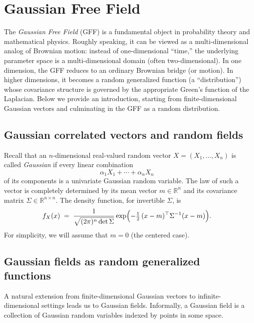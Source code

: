 \documentclass[letterpaper,11pt,oneside,reqno]{book}
\numberwithin{equation}{chapter}  %
\theoremstyle{definition}
\begin{document}
\section{Gaussian Free Field}
\label{lecture9:sec:GFF}

The \emph{Gaussian Free Field} (GFF) is a fundamental object in probability theory and mathematical physics. Roughly speaking, it can be viewed as a multi-dimensional analog of Brownian motion: instead of one-dimensional “time,” the underlying parameter space is a multi-dimensional domain (often two-dimensional). In one dimension, the GFF reduces to an ordinary Brownian bridge (or motion). In higher dimensions, it becomes a random generalized function (a “distribution”) whose covariance structure is governed by the appropriate Green's function of the Laplacian. Below we provide an introduction, starting from finite-dimensional Gaussian vectors and culminating in the GFF as a random distribution.

\subsection{Gaussian correlated vectors and random fields}
\label{lecture9:subsec:gauss_vectors_random_fields}

Recall that an $n$-dimensional real-valued random vector $X = (X_1,\dots, X_n)$ is called \emph{Gaussian} if every linear combination
\[
\alpha_1 X_1 + \cdots + \alpha_n X_n
\]
of its components is a univariate Gaussian random variable. The law of such a vector is completely determined by its mean vector $m \in \mathbb{R}^n$ and its covariance matrix $\Sigma \in \mathbb{R}^{n\times n}$. The density function, for invertible $\Sigma$, is
\[
f_{X}(x) \;=\; \frac{1}{\sqrt{(2\pi)^n \det \Sigma}}
\exp\Bigl(-\tfrac{1}{2}\,(x - m)^\top \Sigma^{-1}(x - m)\Bigr).
\]
For simplicity, we will assume that $m = 0$ (the centered case).

\subsection{Gaussian fields as random generalized functions}

A natural extension from finite-dimensional Gaussian vectors to infinite-dimensional settings leads us to Gaussian fields. Informally, a Gaussian field is a collection of Gaussian random variables indexed by points in some space.
\end{document}
